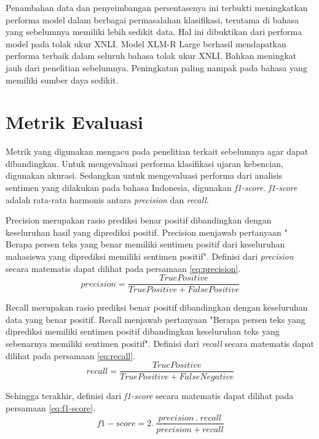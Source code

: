         Penambahan data dan penyeimbangan persentasenya ini terbukti meningkatkan performa model dalam berbagai permasalahan klasifikasi, terutama di bahasa yang sebelumnya memiliki lebih sedikit data. Hal ini dibuktikan dari performa model pada tolak ukur XNLI. Model XLM-R Large berhasil mendapatkan performa terbaik dalam seluruh bahasa tolak ukur XNLI. Bahkan meningkat jauh dari penelitian \parencite{LampleConneau2019} sebelumnya. Peningkatan paling nampak pada bahasa yang memiliki sumber daya sedikit.

\section{Metrik Evaluasi}
Metrik yang digunakan mengacu pada penelitian terkait sebelumnya agar dapat dibandingkan. Untuk mengevaluasi performa klasifikasi ujaran kebencian, digunakan akurasi. Sedangkan untuk mengevaluasi performa dari analisis sentimen yang dilakukan pada bahasa Indonesia, digunakan \textit{f1-score}. \textit{f1-score} adalah rata-rata harmonis antara \textit{precision} dan \textit{recall}. 

Precision merupakan rasio prediksi benar positif dibandingkan dengan keseluruhan hasil yang diprediksi positif. Precision menjawab pertanyaan " Berapa persen teks yang benar memiliki sentimen positif dari keseluruhan mahasiswa yang diprediksi memiliki sentimen positif". Definisi dari \textit{precision} secara matematis dapat dilihat pada persamaan \ref{eq:precision}.
\begin{equation}
    precision=\frac{True Positive}{True Positive + False Positive}
    \label{eq:precision}
\end{equation}

Recall merupakan rasio prediksi benar positif dibandingkan dengan keseluruhan data yang benar positif. Recall menjawab pertanyaan "Berapa persen teks yang diprediksi memiliki sentimen positif dibandingkan keseluruhan teks yang sebenarnya memiliki sentimen positif". Definisi dari \textit{recall} secara matematis dapat dilihat pada persamaan \ref{eq:recall}.
\begin{equation}
    recall=\frac{True Positive}{True Positive + False Negative}
    \label{eq:recall}
\end{equation}

Sehingga terakhir, definisi dari \textit{f1-score} secara matematis dapat dilihat pada persamaan \ref{eq:f1-score}. 
\begin{equation}
    f1-score=2.\: \frac{precision\: .\: recall}{precision+recall}
    \label{eq:f1-score}
\end{equation}

